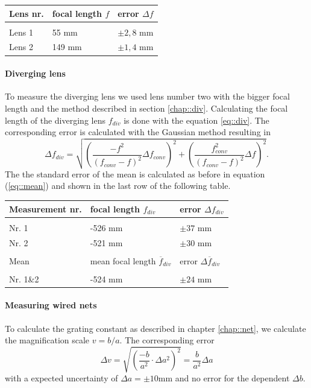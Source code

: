\begin{tabularx}{\textwidth}{XM{5cm}M{5cm}}%
	\toprule 
	Lens nr.&focal length $f$ & error $\Delta f$\\
	\hline
	&&\\[-5pt]
	Lens 1	& 55 \si{\milli \m} & $\pm 2,8$ \si{\milli \m}	\\
	Lens 2	& 149 \si{\milli \m} & $\pm 1,4$ \si{\milli \m}	\\	
	\bottomrule 
\end{tabularx}

\paragraph{Diverging lens}
To measure the diverging lens we used lens number two with the bigger focal length and the method described in section \ref{chap::div}.
Calculating the focal length of the diverging lens $f_{div}$  is done with the equation \ref{eq::div}. 
The corresponding error is calculated with the Gaussian method resulting in
\[
\Delta f_{div}= \sqrt{\left(\frac{-f^2}{(f_{conv}-f)^2} \Delta f_{conv}\right)^2+  \left(\frac{f_{conv}^2}{(f_{conv}-f)^2} \Delta f \right)^2}.
\] 
The the standard error of the mean is calculated as before in equation (\ref{eq::mean}) and shown in the last row of the following table.



\begin{tabularx}{\textwidth}{XM{5cm}M{5cm}}%
	\toprule 
	Measurement nr.&focal length $f_{div}$ & error $\Delta f_{div}$\\
	\hline
	&&\\[-5pt]
	Nr. 1	& -526 \si{\milli \m} & $\pm 37$ \si{\milli \m}	\\
	Nr. 2	& -521 \si{\milli \m} & $\pm 30$ \si{\milli \m}	\\
	\toprule
	&&\\[-5pt]
	Mean	& mean focal length $\overline{f}_{div}$ & error $\Delta \overline{f}_{div}$\\[5pt]
	\midrule
	&&\\[-5pt]
	Nr. 1\&2	& -524 \si{\milli \m} & $\pm 24$ \si{\milli \m}	\\
	\bottomrule 
\end{tabularx}

\paragraph{Measuring wired nets}
To calculate the grating constant as described in chapter \ref{chap::net}, we calculate the magnification scale $v= b/a$.
The corresponding error 
\[
\Delta v= \sqrt{\left(\frac{-b}{a^2} \cdot \Delta a^2\right)^2} = \frac{b}{a^2} \Delta a
\] 
with a expected uncertainty of $\Delta a =\pm 10$\si{\milli \m} and no error for the dependent $\Delta b$.

